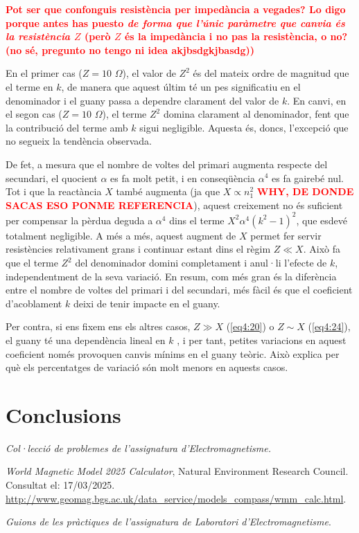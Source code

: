 \documentclass[a4paper,10.5pt]{report}
\begin{document}
\textbf{\textcolor{red}{Pot ser que confonguis resistència per impedància a vegades? Lo digo porque antes has puesto \textit{de forma que l’únic paràmetre que canvia és la resistència $Z$} (però $Z$ és la impedància i no pas la resistència, o no? (no sé, pregunto no tengo ni idea akjbsdgkjbasdg))}}

En el primer cas ($Z = 10$ $\Omega$), el valor de $Z^2$ és del mateix ordre de magnitud que el terme en $k$, de manera que aquest últim té un pes significatiu en el denominador i el guany passa a dependre clarament del valor de $k$. En canvi, en el segon cas ($Z=10$ $\Omega$), el terme $Z^2$ domina clarament al denominador, fent que la contribució del terme amb $k$ sigui negligible. Aquesta és, doncs, l’excepció que no segueix la tendència observada.

De fet, a mesura que el nombre de voltes del primari augmenta respecte del secundari, el quocient $\alpha$ es fa molt petit, i en conseqüència $\alpha^4$ es fa gairebé nul. Tot i que la reactància $X$ també augmenta (ja que $X \propto n_1^2$ \textbf{\textcolor{red}{WHY, DE DONDE SACAS ESO PONME REFERENCIA}}), aquest creixement no és suficient per compensar la pèrdua deguda a $\alpha^4$ dins el terme $X^2 \alpha^4 (k^2 - 1)^2$, que esdevé totalment negligible. A més a més, aquest augment de $X$ permet fer servir resistències relativament grans i continuar estant dins el règim $Z \ll X$. Això fa que el terme $Z^2$ del denominador domini completament i anul·li l’efecte de $k$, independentment de la seva variació. En resum, com més gran és la diferència entre el nombre de voltes del primari i del secundari, més fàcil és que el coeficient d’acoblament $k$ deixi de tenir impacte en el guany.

Per contra, si ens fixem ens els altres casos, $Z \gg X$ (\ref{eq4:20}) o $Z \sim X$ (\ref{eq4:24}), el guany té una dependència lineal en $k$ , i per tant, petites variacions en aquest coeficient només provoquen canvis mínims en el guany teòric. Això explica per què els percentatges de variació són molt menors en aquests casos.





\section{Conclusions}


\begin{thebibliography}{99}
	\textit{Col·lecció de problemes de l'assignatura d'Electromagnetisme.}
	
	\textit{World Magnetic Model 2025 Calculator}, Natural Environment Research Council. Consultat el: 17/03/2025.\\ 
	\url{http://www.geomag.bgs.ac.uk/data_service/models_compass/wmm_calc.html}.
	
	\textit{Guions de les pràctiques de l'assignatura de Laboratori d'Electromagnetisme}.
\end{thebibliography}
\end{document}
